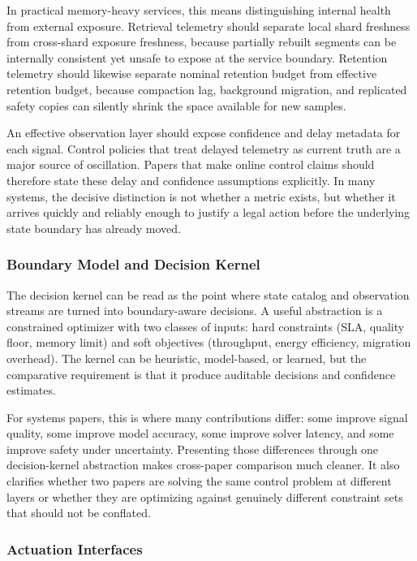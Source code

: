 \documentclass[acmsmall,screen,review]{acmart}
\begin{document}
In practical memory-heavy services, this means distinguishing internal health from external exposure. Retrieval telemetry should separate local shard freshness from cross-shard exposure freshness, because partially rebuilt segments can be internally consistent yet unsafe to expose at the service boundary. Retention telemetry should likewise separate nominal retention budget from effective retention budget, because compaction lag, background migration, and replicated safety copies can silently shrink the space available for new samples.

An effective observation layer should expose confidence and delay metadata for each signal. Control policies that treat delayed telemetry as current truth are a major source of oscillation. Papers that make online control claims should therefore state these delay and confidence assumptions explicitly. In many systems, the decisive distinction is not whether a metric exists, but whether it arrives quickly and reliably enough to justify a legal action before the underlying state boundary has already moved.

\subsubsection{Boundary Model and Decision Kernel}

The decision kernel can be read as the point where state catalog and observation streams are turned into boundary-aware decisions. A useful abstraction is a constrained optimizer with two classes of inputs: hard constraints (SLA, quality floor, memory limit) and soft objectives (throughput, energy efficiency, migration overhead). The kernel can be heuristic, model-based, or learned, but the comparative requirement is that it produce auditable decisions and confidence estimates.

For systems papers, this is where many contributions differ: some improve signal quality, some improve model accuracy, some improve solver latency, and some improve safety under uncertainty. Presenting those differences through one decision-kernel abstraction makes cross-paper comparison much cleaner. It also clarifies whether two papers are solving the same control problem at different layers or whether they are optimizing against genuinely different constraint sets that should not be conflated.

\subsubsection{Actuation Interfaces}
\end{document}
